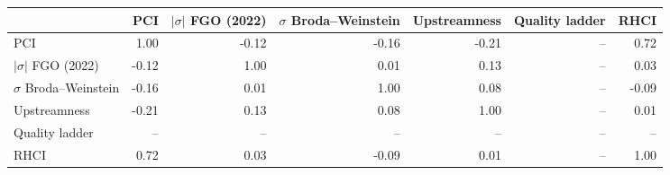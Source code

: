\begin{tabular}{lrrrrrr}
\toprule
 & PCI & $|\sigma|$ FGO (2022) & $\sigma$ Broda--Weinstein & Upstreamness & Quality ladder & RHCI \\
\midrule
PCI & 1.00 & -0.12 & -0.16 & -0.21 & -- & 0.72 \\
$|\sigma|$ FGO (2022) & -0.12 & 1.00 & 0.01 & 0.13 & -- & 0.03 \\
$\sigma$ Broda--Weinstein & -0.16 & 0.01 & 1.00 & 0.08 & -- & -0.09 \\
Upstreamness & -0.21 & 0.13 & 0.08 & 1.00 & -- & 0.01 \\
Quality ladder & -- & -- & -- & -- & -- & -- \\
RHCI & 0.72 & 0.03 & -0.09 & 0.01 & -- & 1.00 \\
\bottomrule
\end{tabular}
